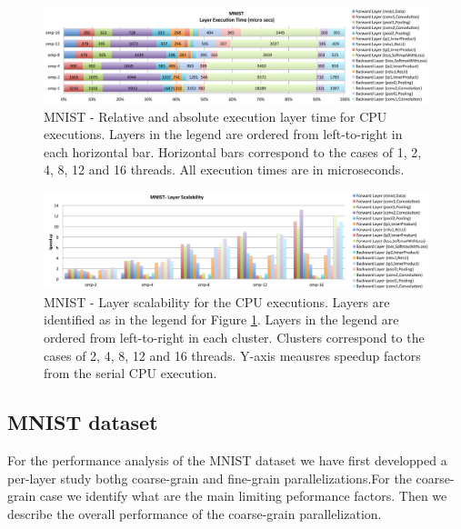 
\begin{figure}[]
\includegraphics[width=\linewidth]{figures/mnist-rel-abs-time.pdf}
\caption{MNIST - Relative and absolute execution layer time for CPU executions. Layers in the legend are ordered from left-to-right in each horizontal bar. Horizontal bars correspond to the cases of 1, 2, 4, 8, 12 and 16 threads. All execution times are in microseconds.}
\label{fig-mnist-abs-rel}
\end{figure}

\begin{figure}[]
\includegraphics[width=\textwidth]{figures/mnist-scalability-layer.pdf}
\caption{MNIST - Layer scalability for the CPU executions. Layers are identified as in the legend for Figure \ref{fig-mnist-abs-rel}. Layers in the legend are ordered from left-to-right in each cluster. Clusters correspond to the cases of 2, 4, 8, 12 and 16 threads. Y-axis meausres speedup factors from the serial CPU execution.}
\label{fig-mnist-scalability}
\end{figure}

\subsection{MNIST dataset}
For the performance analysis of the MNIST dataset we have first 
developped a per-layer study bothg coarse-grain and fine-grain parallelizations.For the coarse-grain case we identify what are the main limiting 
peformance factors. Then we describe the overall performance of the 
coarse-grain parallelization. 

